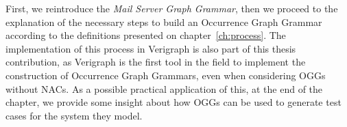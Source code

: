 
First, we reintroduce the \emph{Mail Server Graph Grammar}, then we proceed to the explanation of the necessary steps to build an Occurrence Graph Grammar according to the definitions presented on chapter~\ref{ch:process}. The implementation of this process in Verigraph is also part of this thesis contribution, as Verigraph is the first tool in the field to implement the construction of Occurrence Graph Grammars, even when considering OGGs without NACs. As a possible practical application of this, at the end of the chapter, we provide some insight about how OGGs can be used to generate test cases for the system they model.



